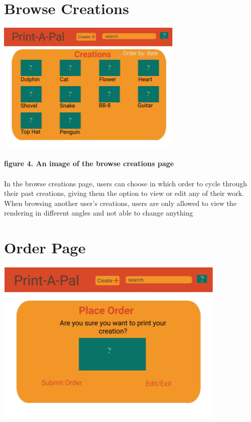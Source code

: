 \documentclass{report}
\begin{document}
\section{Browse Creations}
\begin{center}
\includegraphics[width=\textwidth/2]{creations.png}
\end{center}
\paragraph{figure 4. An image of the browse creations page}
\paragraph{} In the browse creations page, users can choose in which order to cycle through their past creations, giving them the option to view or edit any of their work.  When browsing another user’s creations, users are only allowed to view the rendering in different angles and not able to change anything
\section{Order Page}
\begin{center}
\includegraphics[width=\textwidth/2]{order.png}
\end{center}
\end{document}
